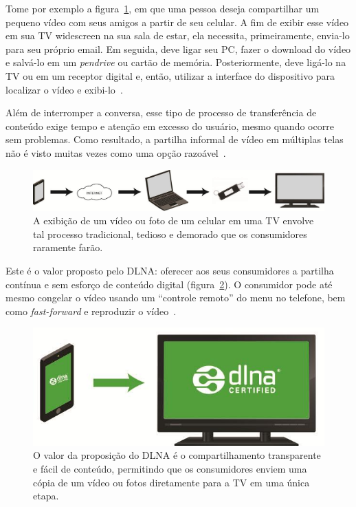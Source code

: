 Tome por exemplo a figura~\ref{fig:traditionalProccess}, em que uma pessoa deseja compartilhar um pequeno vídeo com seus amigos a partir de seu celular. A fim de exibir esse vídeo em sua TV widescreen na sua sala de estar, ela necessita, primeiramente, envia-lo para seu próprio email. Em seguida, deve ligar seu PC, fazer o download do vídeo e salvá-lo em um \emph{pendrive} ou cartão de memória. Posteriormente, deve ligá-lo na TV ou em um receptor digital e, então, utilizar a interface do dispositivo para localizar o vídeo e exibi-lo~\cite{dlnahdvideostreaming}.

Além de interromper a conversa, esse tipo de processo de transferência de conteúdo exige tempo e atenção em excesso do usuário, mesmo quando ocorre sem problemas. Como resultado, a partilha informal de vídeo em múltiplas telas não é visto muitas vezes como uma opção razoável~\cite{dlnahdvideostreaming}.

\begin{figure}[ht]
	\center
	\includegraphics[scale=0.3]{imagens/dlna1}
	\caption{A exibição de um vídeo ou foto de um celular em uma TV envolve tal processo tradicional, tedioso e demorado que os consumidores raramente farão.}
	\label{fig:traditionalProccess}
\end{figure}

Este é o valor proposto pelo DLNA: oferecer aos seus consumidores a partilha contínua e sem esforço de conteúdo digital (figura~\ref{fig:dlnaProccess}). O consumidor pode até mesmo congelar o vídeo usando um ``controle remoto'' do menu no telefone, bem como \emph{fast-forward} e reproduzir o vídeo~\cite{dlnahdvideostreaming}.

\begin{figure}[ht]
	\center
	\includegraphics[scale=0.3]{imagens/dlna2}
	\caption{O valor da proposição do DLNA é o compartilhamento transparente e fácil de conteúdo, permitindo que os consumidores enviem uma cópia de um vídeo ou fotos diretamente para a TV em uma única etapa.}
	\label{fig:dlnaProccess}
\end{figure}

